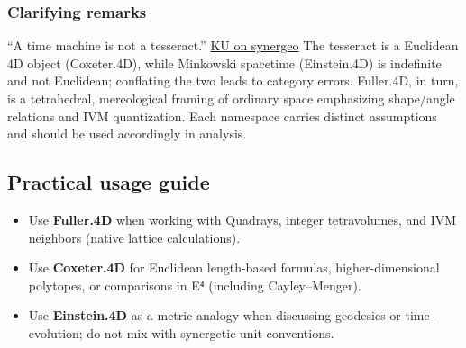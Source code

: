 \documentclass[
  10pt,
]{article}
\providecommand{\tightlist}{%
  \setlength{\itemsep}{0pt}\setlength{\parskip}{0pt}}
\begin{document}
\hypertarget{clarifying-remarks}{%
\subsubsection{Clarifying remarks}\label{clarifying-remarks}}

``A time machine is not a tesseract.''
\href{https://groups.io/g/synergeo/topic/my_take_on_close_pack/114531919}{KU
on synergeo} The tesseract is a Euclidean 4D object (Coxeter.4D), while
Minkowski spacetime (Einstein.4D) is indefinite and not Euclidean;
conflating the two leads to category errors. Fuller.4D, in turn, is a
tetrahedral, mereological framing of ordinary space emphasizing
shape/angle relations and IVM quantization. Each namespace carries
distinct assumptions and should be used accordingly in analysis.

\hypertarget{practical-usage-guide}{%
\subsection{Practical usage guide}\label{practical-usage-guide}}

\begin{itemize}
\tightlist
\item
  Use \textbf{Fuller.4D} when working with Quadrays, integer
  tetravolumes, and IVM neighbors (native lattice calculations).
\item
  Use \textbf{Coxeter.4D} for Euclidean length-based formulas,
  higher-dimensional polytopes, or comparisons in E⁴ (including
  Cayley--Menger).
\item
  Use \textbf{Einstein.4D} as a metric analogy when discussing geodesics
  or time-evolution; do not mix with synergetic unit conventions.
\end{itemize}
\end{document}
